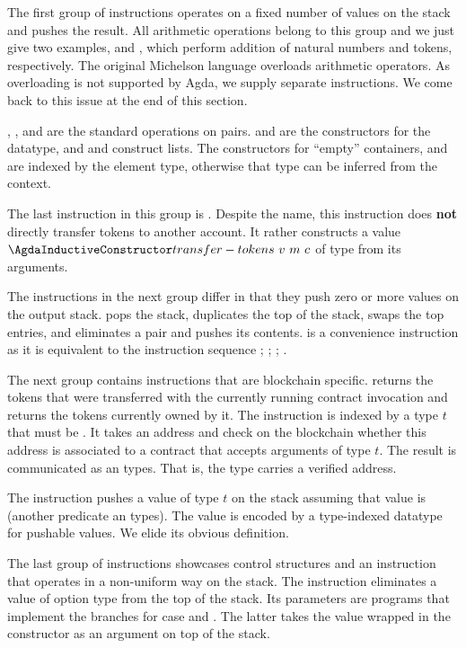 The first group of instructions operates on a fixed number of values on
the stack and pushes the result. All arithmetic operations belong to
this group and we just give two examples, {\AADDnn}  and {\AADDm},
which perform addition of natural numbers and tokens, respectively.
The original Michelson language overloads arithmetic operators. As
overloading is not supported by Agda, we supply separate
instructions. We come back to this issue at the end of this section. 

, , and  are the standard operations on
pairs.  and  are the constructors for the
 datatype, and  and  construct
lists. The constructors for ``empty'' containers,  and
 are indexed by the element type, otherwise that type can be
inferred from the context.

The last instruction in this group is . Despite
the name, this instruction does \textbf{not} directly transfer tokens
to another account. It rather constructs a value
{$\AtransferTokens~v~m~c$} of type {\Aoperation} from its arguments.

The instructions in the next group differ in that they push zero or more
values on the output stack.  pops the stack,  duplicates the top of the
stack,  swaps the top entries, and  eliminates
a pair and pushes its contents.  is a convenience
instruction as it is equivalent to the instruction sequence
; ; ; . 

The next group contains instructions that are blockchain
specific.  returns the tokens that were transferred with
the currently running contract invocation and   returns
the tokens currently owned by it. The  instruction is
indexed by a type $t$ that must be {\APassable}. It takes an address
and check on the blockchain whether this address is associated to a
contract that accepts arguments of type $t$. The result is
communicated as an  types. That is, the {\Acontract} type
carries a verified address.

The  instruction pushes a value of type $t$ on the stack
assuming that value is {\APushable} (another predicate an types). The
value is encoded by a type-indexed datatype  for
pushable values. We elide its obvious definition.

The last group of instructions showcases control structures and an
instruction that operates in a non-uniform way on the stack. The
instruction  eliminates a value of option type from the
top of the stack. Its parameters are programs that implement the branches for case 
and . The latter takes the value wrapped in the 
constructor as an argument on top of the stack.

